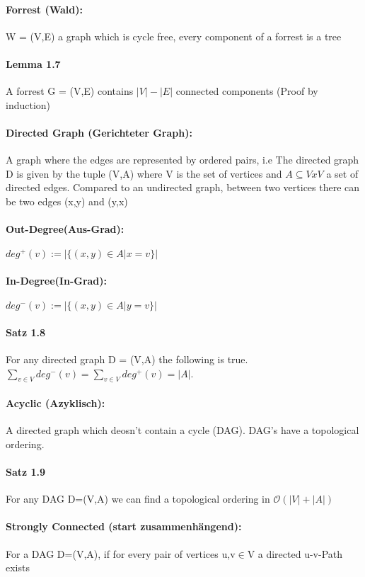 \documentclass[8pt]{extreport}
\begin{document}
\paragraph{Forrest (Wald):} W = (V,E) a graph which is cycle free, every component of a forrest is a tree
\paragraph{Lemma 1.7} A forrest G = (V,E) contains $|V| -|E|$ connected components (Proof by induction)
\paragraph{Directed Graph (Gerichteter Graph):} A graph where the edges are represented by ordered pairs, i.e The directed graph D is given by the tuple (V,A) where V is the set of vertices and $A\subseteq V x V$ a set of directed edges. Compared to an undirected graph, between two vertices there can be two edges (x,y) and (y,x)
\paragraph{Out-Degree(Aus-Grad):} $deg^{+}(v):=|\{(x,y)\in A | x = v\}|$
\paragraph{In-Degree(In-Grad):} $deg^{-}(v):=|\{(x,y)\in A | y = v\}|$
\paragraph{Satz 1.8} For any directed graph D = (V,A) the following is true.\\ $\sum_{v\in V}deg^{-}(v) = \sum_{v\in V}deg^{+}(v) = |A|$.
\paragraph{Acyclic (Azyklisch):} A directed graph which deosn't contain a cycle (DAG). DAG's have a topological ordering.
\paragraph{Satz 1.9} For any DAG D=(V,A) we can find a topological ordering in $ \mathcal{O}(|V| + |A|)$
\paragraph{Strongly Connected (start zusammenhängend):} For a DAG D=(V,A), if for every pair of vertices u,v$\in$V a directed u-v-Path exists
\end{document}
